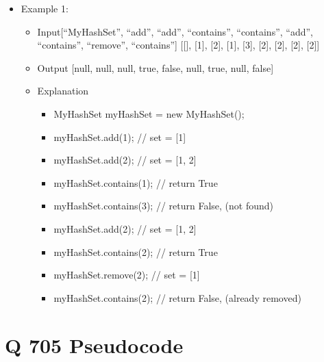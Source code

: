 \documentclass[11pt]{article}
\providecommand{\tightlist}{%
      \setlength{\itemsep}{0pt}\setlength{\parskip}{0pt}}
\begin{document}
\begin{itemize}
\item
  Example 1:

  \begin{itemize}
  \item
    Input{[}``MyHashSet'', ``add'', ``add'', ``contains'', ``contains'',
    ``add'', ``contains'', ``remove'', ``contains''{]} {[}{[}{]},
    {[}1{]}, {[}2{]}, {[}1{]}, {[}3{]}, {[}2{]}, {[}2{]}, {[}2{]},
    {[}2{]}{]}
  \item
    Output {[}null, null, null, true, false, null, true, null, false{]}
  \item
    Explanation

    \begin{itemize}
    \tightlist
    \item
      MyHashSet myHashSet = new MyHashSet();
    \item
      myHashSet.add(1); // set = {[}1{]}
    \item
      myHashSet.add(2); // set = {[}1, 2{]}
    \item
      myHashSet.contains(1); // return True
    \item
      myHashSet.contains(3); // return False, (not found)
    \item
      myHashSet.add(2); // set = {[}1, 2{]}
    \item
      myHashSet.contains(2); // return True
    \item
      myHashSet.remove(2); // set = {[}1{]}
    \item
      myHashSet.contains(2); // return False, (already removed)
    \end{itemize}
  \end{itemize}
\end{itemize}

    \section{Q 705 Pseudocode}\label{q-705-pseudocode}
\end{document}
